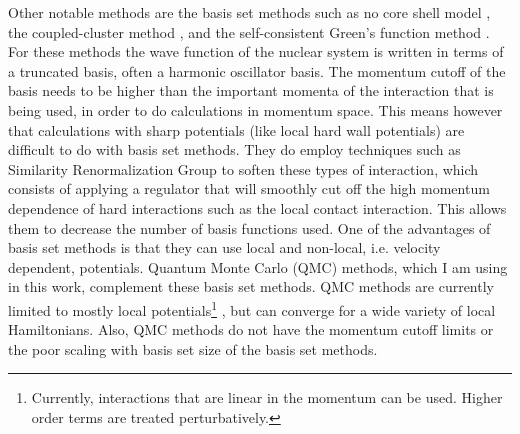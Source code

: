 Other notable methods are the basis set methods such as no core shell model \cite{navratil2009,barrett2013}, the coupled-cluster method \cite{hagen2014}, and the self-consistent Green's function method \cite{dickhoff2004,soma2014}. For these methods the wave function of the nuclear system is written in terms of a truncated basis, often a harmonic oscillator basis. The momentum cutoff of the basis needs to be higher than the important momenta of the interaction that is being used, in order to do calculations in momentum space. This means however that calculations with sharp potentials (like local hard wall potentials) are difficult to do with basis set methods. They do employ techniques such as Similarity Renormalization Group \cite{hergert2016} to soften these types of interaction, which consists of applying a regulator that will smoothly cut off the high momentum dependence of hard interactions such as the local contact interaction. This allows them to decrease the number of basis functions used. One of the advantages of basis set methods is that they can use local and non-local, i.e. velocity dependent, potentials. Quantum Monte Carlo (QMC) methods, which I am using in this work, complement these basis set methods. QMC methods are currently limited to mostly local potentials\footnote{Currently, interactions that are linear in the momentum can be used. Higher order terms are treated perturbatively.} \cite{lynn2012}, but can converge for a wide variety of local Hamiltonians. Also, QMC methods do not have the momentum cutoff limits or the poor scaling with basis set size of the basis set methods.

